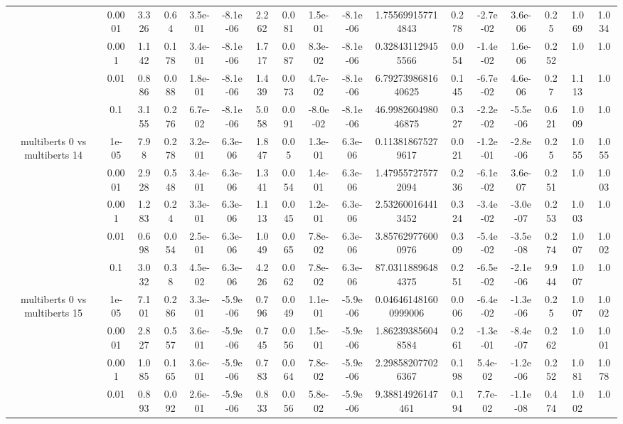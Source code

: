 \begin{tabular}{|c|c|c|c|c|c|c|c|c|c|c|c|c|c|c|c|c|}
 & 0.0001 & 3.326 & 0.64 & 3.5e-01 & -8.1e-06 & 2.262 & 0.081 & 1.5e-01 & -8.1e-06 & 1.755699157714843 & 0.278 & -2.7e-02 & 3.6e-06 & 0.25 & 1.069 & 1.034 \\
 & 0.001 & 1.142 & 0.178 & 3.4e-01 & -8.1e-06 & 1.717 & 0.087 & 8.3e-02 & -8.1e-06 & 0.328431129455566 & 0.054 & -1.4e-02 & 1.6e-06 & 0.252 & 1.0 & 1.0 \\
 & 0.01 & 0.886 & 0.088 & 1.8e-01 & -8.1e-06 & 1.439 & 0.073 & 4.7e-02 & -8.1e-06 & 6.7927398681640625 & 0.145 & -6.7e-02 & 4.6e-06 & 0.27 & 1.113 & 1.0 \\
 & 0.1 & 3.155 & 0.276 & 6.7e-02 & -8.1e-06 & 5.058 & 0.091 & -8.0e-02 & -8.1e-06 & 46.998260498046875 & 0.327 & -2.2e-02 & -5.5e-06 & 0.621 & 1.009 & 1.0 \\
\hline
\multirow{5}{*}{multiberts 0 vs multiberts 14} & 1e-05 & 7.98 & 0.278 & 3.2e-01 & 6.3e-06 & 1.847 & 0.05 & 1.3e-01 & 6.3e-06 & 0.113818675279617 & 0.021 & -1.2e-01 & -2.8e-06 & 0.25 & 1.055 & 1.055 \\
 & 0.0001 & 2.928 & 0.548 & 3.4e-01 & 6.3e-06 & 1.341 & 0.054 & 1.4e-01 & 6.3e-06 & 1.479557275772094 & 0.236 & -6.1e-02 & 3.6e-07 & 0.251 & 1.0 & 1.003 \\
 & 0.001 & 1.283 & 0.24 & 3.3e-01 & 6.3e-06 & 1.113 & 0.045 & 1.2e-01 & 6.3e-06 & 2.532600164413452 & 0.324 & -3.4e-02 & -3.0e-07 & 0.253 & 1.003 & 1.0 \\
 & 0.01 & 0.698 & 0.054 & 2.5e-01 & 6.3e-06 & 1.049 & 0.065 & 7.8e-02 & 6.3e-06 & 3.857629776000976 & 0.309 & -5.4e-02 & -3.5e-08 & 0.274 & 1.007 & 1.002 \\
 & 0.1 & 3.032 & 0.38 & 4.5e-02 & 6.3e-06 & 4.226 & 0.062 & 7.8e-02 & 6.3e-06 & 87.03118896484375 & 0.251 & -6.5e-02 & -2.1e-06 & 9.944 & 1.007 & 1.0 \\
\hline
\multirow{5}{*}{multiberts 0 vs multiberts 15} & 1e-05 & 7.101 & 0.286 & 3.3e-01 & -5.9e-06 & 0.796 & 0.049 & 1.1e-01 & -5.9e-06 & 0.046461481600999006 & 0.006 & -6.4e-02 & -1.3e-06 & 0.25 & 1.007 & 1.002 \\
 & 0.0001 & 2.827 & 0.557 & 3.6e-01 & -5.9e-06 & 0.745 & 0.056 & 1.5e-01 & -5.9e-06 & 1.862393856048584 & 0.261 & -1.3e-01 & -8.4e-07 & 0.262 & 1.0 & 1.001 \\
 & 0.001 & 1.085 & 0.165 & 3.6e-01 & -5.9e-06 & 0.783 & 0.064 & 7.8e-02 & -5.9e-06 & 2.298582077026367 & 0.198 & 5.4e-02 & -1.2e-06 & 0.252 & 1.081 & 1.078 \\
 & 0.01 & 0.893 & 0.092 & 2.6e-01 & -5.9e-06 & 0.833 & 0.056 & 5.8e-02 & -5.9e-06 & 9.38814926147461 & 0.194 & 7.7e-02 & -1.1e-08 & 0.474 & 1.002 & 1.0 \\

\end{tabular}

